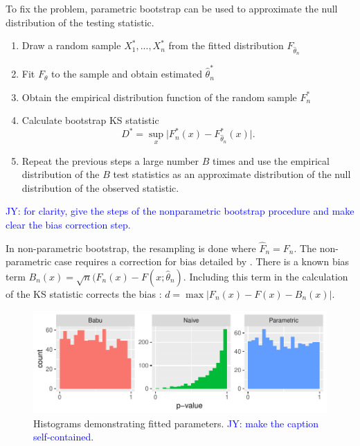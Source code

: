 \documentclass[12pt, letterpaper, titlepage]{article}
\newcommand{\jy}[1]{\textcolor{blue}{JY: #1}}
\begin{document}
To fix the problem, parametric bootstrap can be used to approximate the null
distribution of the testing statistic. 
\begin{enumerate}
  \item 
    Draw a random sample $X_1^*,...,X_n^*$ from the fitted distribution $F_{\hat\theta_n}$
  \item 
    Fit $F_\theta$ to the sample and obtain estimated $\hat\theta_n^*$
  \item
    Obtain the empirical distribution function of the random sample $F_n^*$
  \item 
    Calculate bootstrap KS statistic
    \[
      D^* = \sup_x \lvert F_n^* (x)- F_{\hat\theta_n}^*(x) \rvert.
    \]
  \item
    Repeat the previous steps a large number $B$ times and use the empirical
    distribution of the $B$ test statistics as an approximate distribution of
    the null distribution of the observed statistic.      
\end{enumerate}



\jy{for clarity, give the steps of the nonparametric bootstrap procedure and
  make clear the bias correction step.}

In non-parametric bootstrap, the resampling is done where $\hat{F}_n = F_n$. The non-parametric
case requires a correction for bias detailed by \citet{Babu}. There is a known bias
term $B_{n}(x) = \sqrt{n}(F_{n}(x) - F(x;\hat{\theta}_n)$. Including this term in the
calculation of the KS statistic corrects the bias \citet{Babu}:
$d = \max\lvert F_{n}(x) - F(x) - B_{n}(x) \rvert$.


\begin{figure}[tbp]
  \centering
  \includegraphics[width=\textwidth]{hist_fitted}
  \caption{Histograms demonstrating fitted parameters. \jy{make the caption self-contained.}}
  \label{fig:hist_fitted}
\end{figure}
\end{document}
